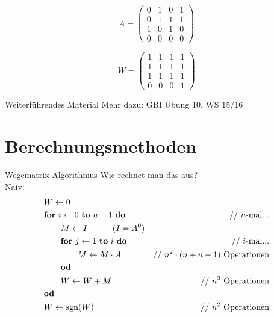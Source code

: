 \begin{frame}
	$$ A = 
	\begin{pmatrix} 
	0 & 1 & 0 & 1 \\ 
	0 & 1 & 1 & 1 \\ 
	1 & 0 & 1 & 0 \\ 
	0 & 0 & 0 & 0 
	\end{pmatrix} $$ 
	\pause 
	
	$$W = 
	\begin{pmatrix} 
	1 & 1 & 1 & 1 \\ 
	1 & 1 & 1 & 1 \\ 
	1 & 1 & 1 & 1 \\ 
	0 & 0 & 0 & 1 
	\end{pmatrix}$$
\end{frame}

\begin{frame}{Weiterführendes Material}
	Mehr dazu:
	GBI Übung 10, WS 15/16
\end{frame}

\section{Berechnungsmethoden}

\begin{frame}{Wegematrix-Algorithmus}
	Wie rechnet man das aus? \\
	Naiv:
	\begin{align*}
	&W \leftarrow 0 \\ 
	&\mathbf{for}\ i \gets 0\ \mathbf{to}\ n-1\ \mathbf{do} & \text{// $n$-mal...}  \\
	&\qquad M \gets I \qqquad (I = A^0) \\
	&\qquad\mathbf{for}\ j \gets 1\ \mathbf{to}\ i\ \mathbf{do} & \text{// $i$-mal...} \\
	&\qquad\qquad M \gets M \* A & \text{// $n^2 \* (n + n-1)$ Operationen} \\
	&\qquad\mathbf{od} \\
	&\qquad W \gets W + M & \text{// $n^2$ Operationen} \\
	&\mathbf{od} \\
	&W \gets \sgn(W) &  \text{// $n^2$ Operationen} \\
	\end{align*}
\end{frame}

